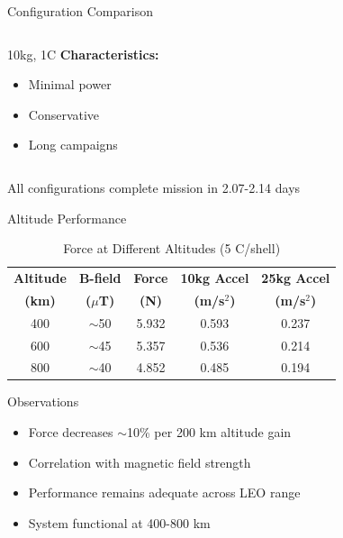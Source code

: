 \documentclass[aspectratio=169]{beamer}
\begin{document}
\begin{frame}{Configuration Comparison}
\begin{columns}[t]
\begin{block}{10kg, 1C}
\textbf{Characteristics:}
\begin{itemize}
    \item Minimal power
    \item Conservative
    \item Long campaigns
\end{itemize}
\end{block}
\end{columns}

\vspace{0.5cm}
\centering
All configurations complete mission in 2.07-2.14 days
\end{frame}

\begin{frame}{Altitude Performance}
\begin{table}
\centering
\caption{Force at Different Altitudes (5 C/shell)}
\begin{tabular}{ccccc}
\toprule
\textbf{Altitude} & \textbf{B-field} & \textbf{Force} & \textbf{10kg Accel} & \textbf{25kg Accel} \\
\textbf{(km)} & \textbf{($\mu$T)} & \textbf{(N)} & \textbf{(m/s$^2$)} & \textbf{(m/s$^2$)} \\
\midrule
400 & $\sim$50 & 5.932 & 0.593 & 0.237 \\
600 & $\sim$45 & 5.357 & 0.536 & 0.214 \\
800 & $\sim$40 & 4.852 & 0.485 & 0.194 \\
\bottomrule
\end{tabular}
\end{table}

\vspace{0.5cm}

\begin{block}{Observations}
\begin{itemize}
    \item Force decreases $\sim$10\% per 200 km altitude gain
    \item Correlation with magnetic field strength
    \item Performance remains adequate across LEO range
    \item System functional at 400-800 km
\end{itemize}
\end{block}
\end{frame}
\end{document}
